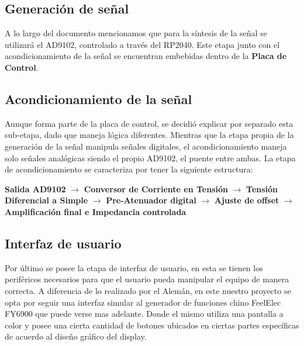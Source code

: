 \subsection{Generación de señal}
A lo largo del documento mencionamos que para la síntesis de la señal se utilizará el AD9102, controlado a través del RP2040. Este etapa junto con el acondicionamiento de la señal se encuentran embebidas dentro de la \textbf{Placa de Control}.

\subsection{Acondicionamiento de la señal}
Aunque forma parte de la placa de control, se decidió explicar por separado esta sub-etapa, dado que maneja lógica diferentes. Mientras que la etapa propia de la generación de la señal manipula señales digitales, el acondicionamiento maneja solo señales analógicas siendo el propio AD9102, el puente entre ambas. La etapa de acondicionamiento se caracteriza por tener la siguiente estructura:

\begin{center}
	\textbf{Salida AD9102} $\rightarrow$ \textbf{Conversor de Corriente en Tensión} $\rightarrow$ \textbf{Tensión Diferencial a Simple} $\rightarrow$ \textbf{Pre-Atenuador digital} $\rightarrow$ \textbf{Ajuste de offset} $\rightarrow$ \textbf{Amplificación final e Impedancia controlada}
\end{center}

\subsection{Interfaz de usuario}
Por último se posee la etapa de interfaz de usuario, en esta se tienen los periféricos necesarios para que el usuario pueda manipular el equipo de manera correcta. A diferencia de lo realizado por el Alemán, en este nuestro proyecto se opta por seguir una interfaz simular al generador de funciones chino FeelElec FY6900 que puede verse mas adelante. Donde el mismo utiliza una pantalla a color y posee una cierta cantidad de botones ubicados en ciertas partes específicas de acuerdo al diseño gráfico del display.


